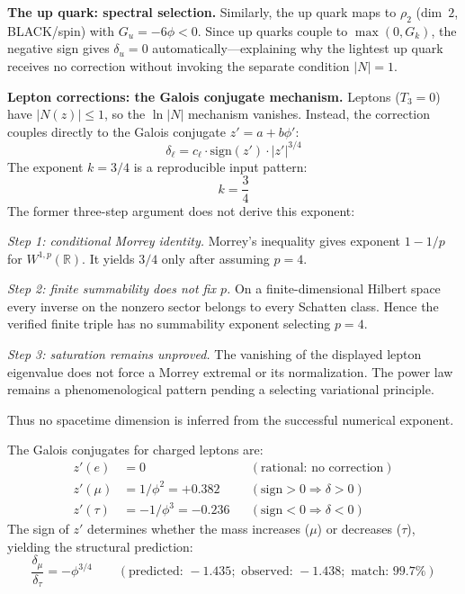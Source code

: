 \documentclass[12pt,a4paper]{article}
\theoremstyle{definition}
\begin{document}
\textbf{The up quark: spectral selection.}  Similarly, the up quark maps to $\rho_2$ (dim~$2$, BLACK/spin) with $G_u = -6\phi < 0$.  Since up quarks couple to $\max(0, G_k)$, the negative sign gives $\delta_u = 0$ automatically---explaining why the lightest up quark receives no correction without invoking the separate condition $|N| = 1$.

\textbf{Lepton corrections: the Galois conjugate mechanism.} Leptons ($T_3 = 0$) have $|N(z)| \leq 1$, so the $\ln|N|$ mechanism vanishes. Instead, the correction couples directly to the Galois conjugate $z' = a + b\phi'$:
\begin{equation}
\boxed{\delta_\ell = c_\ell \cdot \mathrm{sign}(z') \cdot |z'|^{3/4}}
\label{eq:lepton_corr}
\end{equation}
The exponent $k=3/4$ is a reproducible input pattern:
\begin{equation}
\boxed{k=\frac34}
\label{eq:lepton_k}
\end{equation}
The former three-step argument does not derive this exponent:

\emph{Step 1: conditional Morrey identity.}  Morrey's inequality gives exponent $1-1/p$ for $W^{1,p}(\mathbb R)$.  It yields $3/4$ only after assuming $p=4$.

\emph{Step 2: finite summability does not fix $p$.}  On a finite-dimensional Hilbert space every inverse on the nonzero sector belongs to every Schatten class.  Hence the verified finite triple has no summability exponent selecting $p=4$.

\emph{Step 3: saturation remains unproved.}  The vanishing of the displayed lepton eigenvalue does not force a Morrey extremal or its normalization.  The power law remains a phenomenological pattern pending a selecting variational principle.

Thus no spacetime dimension is inferred from the successful numerical exponent.

The Galois conjugates for charged leptons are:
\begin{align}
z'(e) &= 0 && (\text{rational: no correction}) \\
z'(\mu) &= 1/\phi^2 = +0.382 && (\text{sign} > 0 \Rightarrow \delta > 0) \\
z'(\tau) &= -1/\phi^3 = -0.236 && (\text{sign} < 0 \Rightarrow \delta < 0)
\end{align}
The sign of $z'$ determines whether the mass increases ($\mu$) or decreases ($\tau$), yielding the structural prediction:
\begin{equation}
\frac{\delta_\mu}{\delta_\tau} = -\phi^{3/4} \qquad (\text{predicted: } -1.435; \text{ observed: } -1.438; \text{ match: } 99.7\%)
\end{equation}
\end{document}
